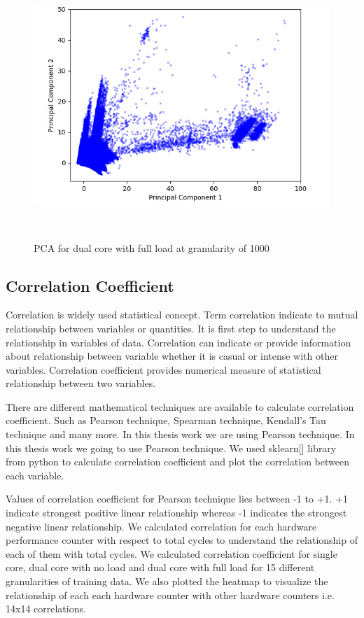 \begin{figure}[h!]
\includegraphics[width=12cm, height=10cm]{./images/dual_full_pca}
\centering
\caption{PCA for dual core with full load at granularity of 1000}
\label{fig:flow}
\end{figure}


\subsection{Correlation Coefficient}
Correlation is widely used statistical concept. Term correlation indicate to mutual relationship between variables or quantities. It is first step to understand the relationship in variables of data. Correlation can indicate or provide information about relationship between variable whether it is casual or intense with other variables. Correlation coefficient provides numerical measure of statistical relationship between two variables. 

\par There are different mathematical techniques are available to calculate correlation coefficient. Such as Pearson technique, Spearman technique, Kendall's Tau technique and many more. In this thesis work we are using Pearson technique. In this thesis work we going to use Pearson technique. We used sklearn[] library from python to calculate correlation coefficient and plot the correlation between each variable. 

\par Values of correlation coefficient for Pearson technique lies between -1 to +1. +1 indicate strongest positive linear relationship whereas -1 indicates the strongest negative linear relationship. We calculated correlation for each hardware performance counter with respect to total cycles to understand the relationship of each of them with total cycles. We calculated correlation coefficient for single core, dual core with no load and dual core with full load for 15 different granularities of training data. We also plotted the heatmap to visualize the relationship of each each hardware counter with other hardware counters i.e. 14x14 correlations. 

